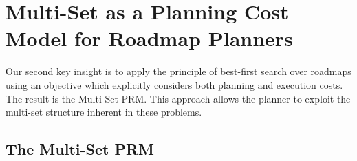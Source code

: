 %
%
%
%
%
%
%
%
%
%
%
%



\clearpage
\section{Multi-Set as a Planning Cost Model for Roadmap Planners}
\label{chap:multi-set-prm}

Our second key insight
is to apply the principle of best-first search over roadmaps
using an objective which explicitly considers both planning and
execution costs.
The result is the Multi-Set PRM.
This approach allows the planner to exploit the multi-set structure
inherent in these problems.

\subsection{The Multi-Set PRM}


